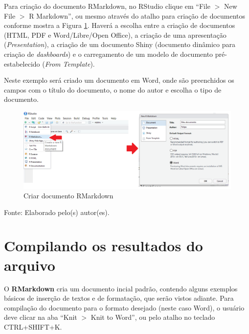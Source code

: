 \documentclass[12pt,portuguese,oneside]{book}
\begin{document}
Para criação do documento RMarkdown, no RStudio clique em ``File \(>\)
New File \(>\) R Markdown'', ou mesmo através do atalho para criação de
documentos conforme mostra a Figura \ref{fig:criararq1}. Haverá a
escolha entre a criação de documentos (HTML, PDF e Word/Libre/Open
Office), a criação de uma apresentação (\emph{Presentation}), a criação
de um documento Shiny (documento dinâmico para criação de
\emph{dashboards}) e o carregamento de um modelo de documento
pré-estabelecido (\emph{From Template}).

Neste exemplo será criado um documento em Word, onde são preenchidos os
campos com o título do documento, o nome do autor e escolha o tipo de
documento.

\begin{figure}[H]

{\centering \includegraphics[width=0.8\linewidth]{criararq1} 

}

\caption{Criar documento RMarkdown}\label{fig:criararq1}
\end{figure}

Fonte: Elaborado pelo(s) autor(es).

\section{Compilando os resultados do
arquivo}\label{compilando-os-resultados-do-arquivo}

O \textbf{RMarkdown} cria um documento incial padrão, contendo alguns
exemplos básicos de inserção de textos e de formatação, que serão vistos
adiante. Para compilação do documento para o formato desejado (neste
caso Word), o usuário deve clicar na aba ``Knit \(>\) Knit to Word'', ou
pelo atalho no teclado CTRL+SHIFT+K.
\end{document}
